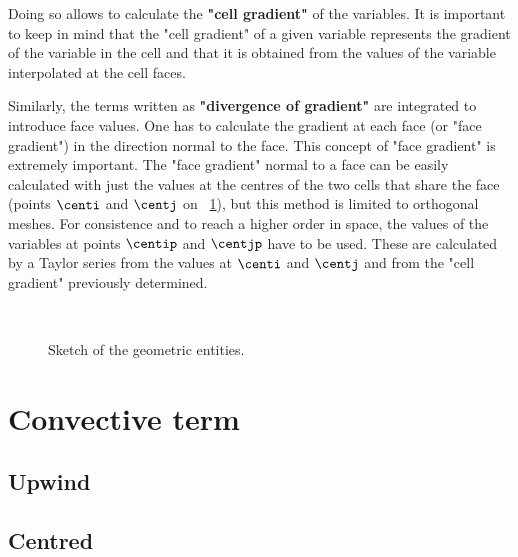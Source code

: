 Doing so allows to calculate the \textbf{"cell gradient"} of the variables.
It is important to keep in mind that the "cell gradient" of a given variable
represents the gradient of the variable in the cell and that it is obtained
from the values of the variable interpolated at the cell faces.

Similarly, the terms written as \textbf{"divergence of gradient"} are
integrated to introduce face values. One has to calculate the gradient at
each face (or "face gradient") in the direction normal to the face. This
concept of "face gradient" is extremely important. The "face gradient"
normal to a face can be easily calculated with just the values at the
centres of the two cells that share the face (points $\centi$ and $\centj$ on 
\figurename~\ref{fig:sketch_internal_external_faces}),
but this method is limited to orthogonal meshes.
For consistence and to reach a higher order in space, the values of the
variables at points $\centip$ and $\centjp$ have to be used. These are calculated by a
Taylor series from the values at $\centi$ and $\centj$ and from the "cell gradient"
previously determined.

\begin{figure}[t]
\centering
\mbox{
 \,
}%
\caption{Sketch of the geometric entities.}
\label{fig:sketch_internal_external_faces}
\end{figure}


\section{Convective term}

\subsection{Upwind}

\subsection{Centred}

